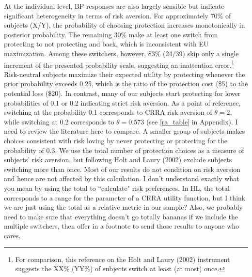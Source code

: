 \documentclass[12pt,a4paper]{article}
\newcommand{\aut}[1]{{\color{Red}#1}}
\newcommand{\pmt}[1]{{\color{Blue}#1}}
\begin{document}
At the individual level, BP responses are also largely sensible but  indicate significant heterogeneity in terms of risk aversion. For approximately 70\% of subjects (X/Y), the probability of choosing protection increases monotonically in posterior probability. The remaining 30\% make at least one switch from protecting to not protecting and back, which is inconsistent with EU maximization. Among these switchers, however, 83\% (24/39) skip only a single increment of the presented probability scale, suggesting an inattention error.\footnote{For comparison, this reference on the Holt and Laury (2002) instrument suggests the XX\% (YY\%) of subjects switch at least (at most) once.}  Risk-neutral subjects maximize their expected utility by protecting whenever the prior probability exceeds 0.25, which is the ratio of the protection cost (\$5) to the potential loss (\$20). In contrast, many of our subjects start protecting for lower probabilities of 0.1 or 0.2 indicating strict risk aversion. As a point of reference, switching at the probability 0.1 corresponds to CRRA risk aversion of $\theta=2$, while switching at 0.2 corresponds to $\theta=0.573$ (see \ref{ra_table} in Appendix).  \aut{I need to review the literature here to compare.} A smaller group of subjects makes choices consistent with risk loving by never protecting or protecting for the probability of 0.3. We use the total number of protection choices as a measure of subjects’ risk aversion, but following Holt and Laury (2002) exclude subjects switching more than once. Most of our results do not condition on risk aversion and hence are not affected by this calculation. \pmt{I don't understand exactly what you mean by using the total to ``calculate" risk preferences.  In HL, the total corresponds to a range for the parameter of a CRRA utility function, but I think we are just using the total as a relative metric in our sample?  Also, we probably need to make sure that everything doesn't go totally bananas if we include the multiple switchers, then offer in a footnote to send those results to anyone who cares.}
\end{document}
